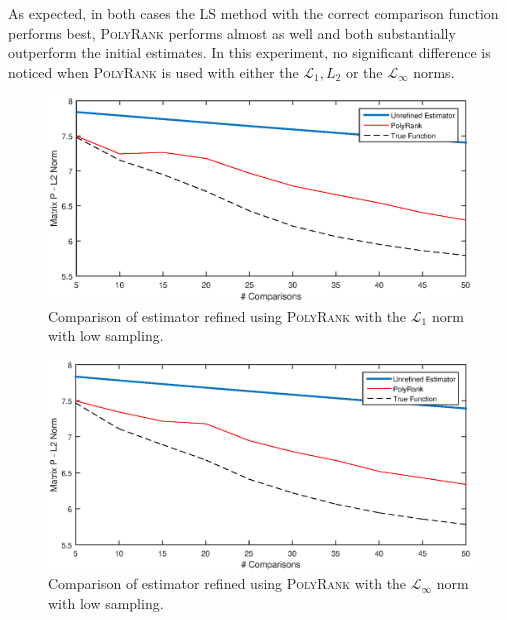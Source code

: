 \documentclass[twoside,11pt]{article}
\begin{document}
As expected, in both cases the LS method with the correct comparison function performs best, \textsc{PolyRank} performs almost as well and both substantially outperform the initial estimates. In this experiment, no significant difference is noticed when \textsc{PolyRank} is used with either the $\mathcal{L}_1,L_2$ or the $\mathcal{L}_{\infty}$ norms.
\begin{figure}
  \centering
    \includegraphics[width=1\textwidth]{L1_figure_2.eps}
    \caption{Comparison of estimator refined using \textsc{PolyRank} with the $\mathcal{L}_1$ norm with low sampling. \label{L1_figure_2}}
\end{figure}

\begin{figure}
  \centering
    \includegraphics[width=1\textwidth]{Linf_figure_2.eps}
    \caption{Comparison of estimator refined using \textsc{PolyRank} with the $\mathcal{L}_{\infty}$ norm with low sampling. \label{Linf_figure_2}}
\end{figure}
\end{document}
